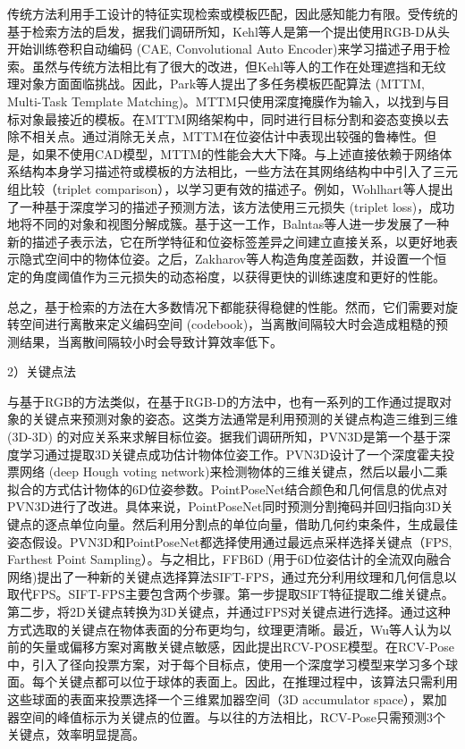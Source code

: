 \documentclass[12pt]{article}
\begin{document}
传统方法\cite{hinterstoisser43,huttenlocher44,steger45,hinterstoisser46,hinterstoisser47}利用手工设计的特征实现检索或模板匹配，因此感知能力有限。受传统的基于检索方法的启发，据我们调研所知，Kehl等人\cite{kehl48}是第一个提出使用RGB-D从头开始训练卷积自动编码 (CAE, Convolutional Auto Encoder)\cite{masci49}来学习描述子用于检索。虽然与传统方法相比有了很大的改进，但Kehl等人的工作在处理遮挡和无纹理对象方面面临挑战。因此，Park等人\cite{park50}提出了多任务模板匹配算法 (MTTM, Multi-Task Template Matching)。MTTM只使用深度掩膜作为输入，以找到与目标对象最接近的模板。在MTTM网络架构中，同时进行目标分割和姿态变换以去除不相关点。通过消除无关点，MTTM在位姿估计中表现出较强的鲁棒性。但是，如果不使用CAD模型，MTTM的性能会大大下降。与上述直接依赖于网络体系结构本身学习描述符或模板的方法相比，一些方法在其网络结构中中引入了三元组比较（triplet comparison），以学习更有效的描述子。例如，Wohlhart等人\cite{wohlhart51}提出了一种基于深度学习的描述子预测方法，该方法使用三元损失 (triplet loss)，成功地将不同的对象和视图分解成簇。基于这一工作\cite{wohlhart51}，Balntas等人\cite{balntas52}进一步发展了一种新的描述子表示法，它在所学特征和位姿标签差异之间建立直接关系，以更好地表示隐式空间中的物体位姿。之后，Zakharov等人\cite{zakharov53}构造角度差函数，并设置一个恒定的角度阈值作为三元损失的动态裕度，以获得更快的训练速度和更好的性能。

总之，基于检索的方法在大多数情况下都能获得稳健的性能。然而，它们需要对旋转空间进行离散来定义编码空间 (codebook)，当离散间隔较大时会造成粗糙的预测结果，当离散间隔较小时会导致计算效率低下。

2）关键点法

与基于RGB的方法类似，在基于RGB-D的方法中，也有一系列的工作通过提取对象的关键点来预测对象的姿态。这类方法通常是利用预测的关键点构造三维到三维 (3D-3D) 的对应关系来求解目标位姿。据我们调研所知，PVN3D\cite{he2020pvn3d54}是第一个基于深度学习通过提取3D关键点成功估计物体位姿工作。PVN3D设计了一个深度霍夫投票网络 (deep Hough voting network)来检测物体的三维关键点，然后以最小二乘拟合的方式估计物体的6D位姿参数。PointPoseNet\cite{chen2020pointposenet55}结合颜色和几何信息的优点对PVN3D进行了改进。具体来说，PointPoseNet同时预测分割掩码并回归指向3D关键点的逐点单位向量。然后利用分割点的单位向量，借助几何约束条件，生成最佳姿态假设。PVN3D和PointPoseNet都选择使用通过最远点采样选择关键点（FPS, Farthest Point Sampling）。与之相比，FFB6D (用于6D位姿估计的全流双向融合网络)\cite{he2021ffb6d56}提出了一种新的关键点选择算法SIFT-FPS，通过充分利用纹理和几何信息以取代FPS。SIFT-FPS主要包含两个步骤。第一步提取SIFT特征提取二维关键点。第二步，将2D关键点转换为3D关键点，并通过FPS对关键点进行选择。通过这种方式选取的关键点在物体表面的分布更均匀，纹理更清晰。最近，Wu等人\cite{wu2022vote57}认为以前的矢量或偏移方案对离散关键点敏感，因此提出RCV-POSE模型。在RCV-Pose中，引入了径向投票方案，对于每个目标点，使用一个深度学习模型来学习多个球面。每个关键点都可以位于球体的表面上。因此，在推理过程中，该算法只需利用这些球面的表面来投票选择一个三维累加器空间（3D accumulator space），累加器空间的峰值标示为关键点的位置。与以往的方法相比，RCV-Pose只需预测3个关键点，效率明显提高。
\end{document}
